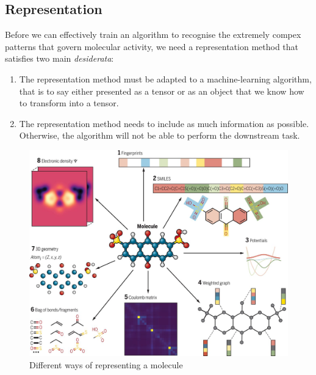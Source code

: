 \documentclass[11pt]{article}
\numberwithin{equation}{subsection}
\begin{document}
\subsection{Representation}
\label{sec:representation}

Before we can effectively train an algorithm to recognise the extremely compex patterns that govern molecular activity, we need a representation method that satisfies two main \textit{desiderata}:
\begin{enumerate}
  \item The representation method must be adapted to a machine-learning algorithm, that is to say either presented as a tensor or as an object that we know how to transform into a tensor.
  \item The representation method needs to include as much information as possible. Otherwise, the algorithm will not be able to perform the downstream task.
\end{enumerate}


\begin{figure}[ht]
  \includegraphics[width=1.05\textwidth,center]{representation}
  \caption{Different ways of representing a molecule \citep{sanchez-moleculardesign2018}}
  \label{fig:representation}
\end{figure}
\end{document}
